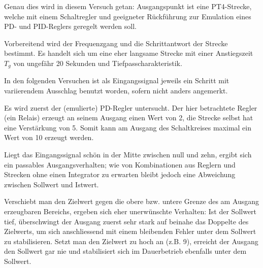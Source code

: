\documentclass[a4paper,10pt]{article}
\begin{document}

\vspace{1em}

Genau dies wird  in diesem Versuch getan: Ausgangspunkt  ist eine PT4-Strecke,
welche  mit einem  Schaltregler und  geeigneter R\"uckf\"uhrung  zur Emulation
eines PD- und PID-Reglers geregelt werden soll.

Vorbereitend  wird  der  Frequenzgang   und  die  Schrittantwort  der  Strecke
bestimmt. Es handelt sich um eine eher langsame Strecke mit einer Anstiegszeit
$T_g$ von ungef\"ahr 20 Sekunden und Tiefpasscharakteristik.

\vspace{1em}
In  den folgenden  Versuchen ist  als Eingangssignal  jeweils ein  Schritt mit
variierendem Ausschlag benutzt worden, sofern nicht anders angemerkt.



\vspace{1em}

Es  wird zuerst  der  (emulierte) PD-Regler  untersucht. Der hier  betrachtete
Regler (ein  Relais) erzeugt an seinem  Ausgang einen Wert von  2, die Strecke
selbst hat eine  Verst\"arkung von 5. Somit kann am  Ausgang des Schaltkreises
maximal ein Wert von 10 erzeugt werden.

Liegt das Eingangssignal  sch\"on in der Mitte zwischen null  und zehn, ergibt
sich ein  passables Ausgangsverhalten; wie  von Kombinationen aus  Reglern und
Strecken  ohne einen  Integrator  zu erwarten  bleibt  jedoch eine  Abweichung
zwischen Sollwert und Istwert.

Verschiebt man den Zielwert gegen die  obere bzw. untere Grenze des am Ausgang
erzeugbaren  Bereichs, ergeben  sich  eher  unerw\"unschte Verhalten: Ist  der
Sollwert tief,  \"uberschwingt der Ausgang  zuerst sehr stark auf  beinahe das
Doppelte  des Zielwerts,  um sich  anschliessend mit  einem bleibenden  Fehler
unter  dem  Sollwert zu  stabilisieren. Setzt  man  den  Zielwert zu  hoch  an
(z.B. 9), erreicht der  Ausgang den Sollwert gar nie und  stabilisiert sich im
Dauerbetrieb ebenfalls unter dem Sollwert.
\end{document}
